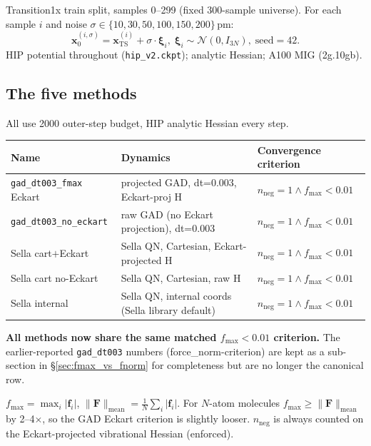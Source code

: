 \documentclass[11pt]{article}
\begin{document}
Transition1x train split, samples 0--299 (fixed 300-sample universe).
For each sample $i$ and noise $\sigma \in \{10,30,50,100,150,200\}$\,pm:
\[
\mathbf{x}_0^{(i,\sigma)} = \mathbf{x}_{\text{TS}}^{(i)} + \sigma \cdot \boldsymbol{\xi}_i,\;
\boldsymbol{\xi}_i \sim \mathcal{N}(0, I_{3N}),\;\text{seed}=42.
\]
HIP potential throughout (\texttt{hip\_v2.ckpt}); analytic Hessian; A100 MIG (2g.10gb).

\subsection{The five methods}

All use 2000 outer-step budget, HIP analytic Hessian every step.

\begin{center}
\begin{tabular}{lll}
\toprule
Name & Dynamics & Convergence criterion \\
\midrule
\texttt{gad\_dt003\_fmax} Eckart        & projected GAD, dt=0.003, Eckart-proj H            & $n_{\text{neg}}{=}1 \wedge f_{\max}{<}0.01$ \\
\texttt{gad\_dt003\_no\_eckart}         & raw GAD (no Eckart projection), dt=0.003          & $n_{\text{neg}}{=}1 \wedge f_{\max}{<}0.01$ \\
Sella cart$+$Eckart                     & Sella QN, Cartesian, Eckart-projected H           & $n_{\text{neg}}{=}1 \wedge f_{\max}{<}0.01$ \\
Sella cart no-Eckart                    & Sella QN, Cartesian, raw H                        & $n_{\text{neg}}{=}1 \wedge f_{\max}{<}0.01$ \\
Sella internal                          & Sella QN, internal coords (Sella library default) & $n_{\text{neg}}{=}1 \wedge f_{\max}{<}0.01$ \\
\bottomrule
\end{tabular}
\end{center}

\textbf{All methods now share the same matched $f_{\max}{<}0.01$ criterion.} The earlier-reported
\texttt{gad\_dt003} numbers (force\_norm-criterion) are kept as a sub-section in §\ref{sec:fmax_vs_fnorm}
for completeness but are no longer the canonical row.

$f_{\max} = \max_i |\mathbf{f}_i|$, $\|\mathbf{F}\|_{\text{mean}} = \frac{1}{N}\sum_i |\mathbf{f}_i|$.
For $N$-atom molecules $f_{\max} \geq \|\mathbf{F}\|_{\text{mean}}$ by
2--4$\times$, so the GAD Eckart criterion is slightly looser. $n_{\text{neg}}$
is always counted on the Eckart-projected vibrational Hessian (enforced).
\end{document}

